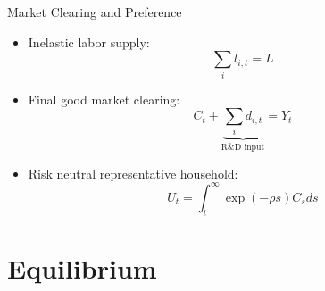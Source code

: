 \documentclass[
  10pt,               %
  aspectratio=169,     %
]{beamer}
\theoremstyle{plain}
\begin{document}
%
\begin{frame}{Market Clearing and Preference}
  \begin{itemize}
    \item Inelastic labor supply:
          \[
            \sum_{i}l_{i,t}=L
          \]
    \item Final good market clearing:
          \[
            C_{t}+\underbrace{\sum_{i}d_{i,t}}_{\text{R\&D input}}=Y_{t}
          \]
    \item Risk neutral representative household:
          \[
            U_t =\int_{t}^{\infty}\exp\left(-\rho s\right)C_{s}ds
          \]
  \end{itemize}
\end{frame}

\section{Equilibrium}
\end{document}
